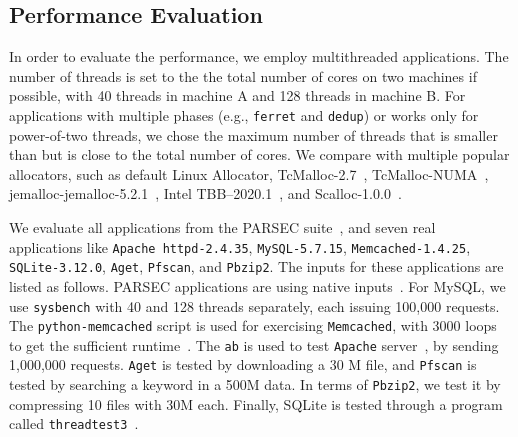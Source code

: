 \subsection{Performance Evaluation}

\label{sec:performance}

In order to evaluate the performance, we employ  multithreaded applications. The number of threads is set to the the total number of cores on two machines if possible, with 40 threads in machine A and 128 threads in machine B. For applications with multiple phases (e.g., \texttt{ferret} and \texttt{dedup}) or works only for power-of-two threads, we chose the maximum number of threads that is smaller than but is close to the total number of cores.  We compare \NM{} with multiple popular allocators, such as default Linux Allocator, TcMalloc-2.7~\cite{tcmalloc},  TcMalloc-NUMA~\cite{tcmallocnew}, jemalloc-jemalloc-5.2.1~\cite{jemalloc}, Intel TBB--2020.1~\cite{tbb}, and Scalloc-1.0.0~\cite{Scalloc}. 

We evaluate all applications from the PARSEC suite~\cite{parsec}, and seven real applications like \texttt{Apache httpd-2.4.35}, \texttt{MySQL-5.7.15}, \texttt{Memcached-1.4.25}, \texttt{SQLite-3.12.0}, \texttt{Aget}, \texttt{Pfscan}, and \texttt{Pbzip2}. 
The inputs for these applications are listed as follows. PARSEC applications are using native inputs~\cite{parsec}. For MySQL, we use \texttt{sysbench} with 40 and 128 threads separately, each issuing 100,000  requests. The \texttt{python-memcached} script is used for exercising \texttt{Memcached}, with 3000 loops to get the sufficient runtime~\cite{memcached}. The  \texttt{ab} is used to test \texttt{Apache} server~\cite{apachetest}, by sending 1,000,000 requests. \texttt{Aget} is tested  by downloading a 30 M file, and \texttt{Pfscan} is tested by searching  a keyword in a 500M data. In terms of \texttt{Pbzip2}, we test it by compressing 10 files with 30M each. Finally, SQLite is tested through a program called \texttt{threadtest3}~\cite{sqlitetest}. 



